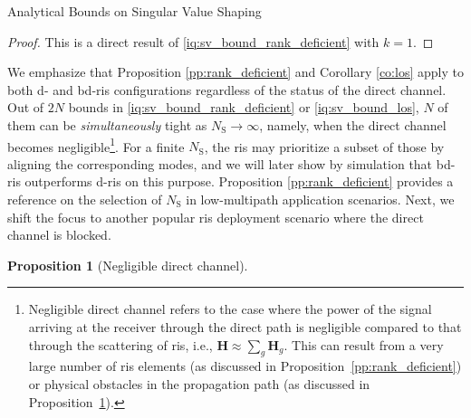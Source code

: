 \documentclass[journal]{IEEEtran}
\newtheorem{proposition}{Proposition}
\begin{document}
\begin{section}{Analytical Bounds on Singular Value Shaping}
		\begin{proof}
			This is a direct result of \eqref{iq:sv_bound_rank_deficient} with $k = 1$.
		\end{proof}

		We emphasize that
		Proposition \ref{pp:rank_deficient} and Corollary \ref{co:los} apply to both \gls{d}- and \gls{bd}-\gls{ris} configurations regardless of the status of the direct channel.
		Out of $2N$ bounds in \eqref{iq:sv_bound_rank_deficient} or \eqref{iq:sv_bound_los}, $N$ of them
		can be \emph{simultaneously} tight as $N_\mathrm{S} \to \infty$, namely, when the direct channel becomes negligible\footnote{Negligible direct channel refers to the case where the power of the signal arriving at the receiver through the direct path is negligible compared to that through the scattering of \gls{ris}, i.e., $\mathbf{H} \approx \sum_g \mathbf{H}_g$. This can result from a very large number of \gls{ris} elements (as discussed in Proposition~\ref{pp:rank_deficient}) or physical obstacles in the propagation path (as discussed in Proposition~\ref{pp:direct_negligible}).}.
		For a finite $N_\mathrm{S}$, the \gls{ris} may prioritize a subset of those by aligning the corresponding modes, and we will later show by simulation that \gls{bd}-\gls{ris} outperforms \gls{d}-\gls{ris} on this purpose.
		Proposition \ref{pp:rank_deficient} provides a reference on the selection of $N_\mathrm{S}$ in low-multipath application scenarios.
		Next, we shift the focus to another popular \gls{ris} deployment scenario where the direct channel is blocked.


		\begin{proposition}[Negligible direct channel]\label{pp:direct_negligible}


\end{proposition}
\end{section}
\end{document}
